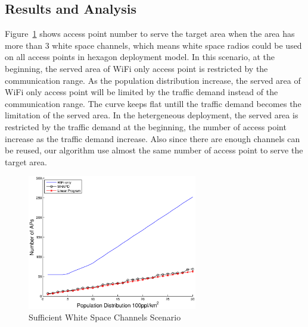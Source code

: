 \subsection{Results and Analysis} 
\label{subsec:result}

Figure~\ref{fig:enoughchannels} shows access point number to serve the target area when 
the area has more than 3 white space channels, which means white space radios could be used
on all access points in hexagon deployment model. In this scenario, at the beginning, the served
area of WiFi only access point is restricted by the communication range. As the population distribution
increase, the served area of WiFi only access point will be limited by the traffic demand instead 
of the communication range. The curve keeps flat untill the traffic demand becomes the limitation
of the served area. In the hetergeneous deployment, the served area is restricted by the traffic
demand at the beginning, the number of access point increase as the traffic demand increase. 
Also since there are enough channels can be reused, our algorithm use almost the same number of 
access point to serve the target area. 






\begin{figure}
\centering
\includegraphics[width=74mm]{figures/enoughchannels}
\vspace{-0.1in}
\caption{Sufficient White Space Channels Scenario}                                                                 
\label{fig:enoughchannels}
\vspace{-0.1in}
\end{figure}



